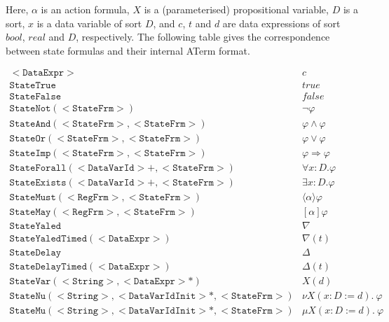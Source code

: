 Here, $\alpha$ is an action formula, $X$ is a (parameterised) propositional variable, $D$ is a
sort, $x$ is a data variable of sort $D$, and $c$, $t$ and $d$ are data expressions of sort
$bool$, $real$ and $D$, respectively. The following table gives the correspondence between
state formulas and their internal ATerm format.

\[
\begin{array}{ll}
\mathtt{<DataExpr>                                        } & c                              \\
\mathtt{StateTrue                                         } & true                           \\
\mathtt{StateFalse                                        } & false                          \\
\mathtt{StateNot(<StateFrm>)                              } & \neg \varphi                   \\
\mathtt{StateAnd(<StateFrm>, <StateFrm>)                  } & \varphi \wedge \varphi         \\
\mathtt{StateOr(<StateFrm>, <StateFrm>)                   } & \varphi \vee \varphi           \\
\mathtt{StateImp(<StateFrm>, <StateFrm>)                  } & \varphi \Rightarrow \varphi    \\
\mathtt{StateForall(<DataVarId>+, <StateFrm>)             } & \forall x{:}D .\varphi         \\
\mathtt{StateExists(<DataVarId>+, <StateFrm>)             } & \exists x{:}D .\varphi         \\
\mathtt{StateMust(<RegFrm>, <StateFrm>)                   } & \langle\alpha\rangle \varphi   \\
\mathtt{StateMay(<RegFrm>, <StateFrm>)                    } & [\alpha] \varphi               \\
\mathtt{StateYaled                                        } & \nabla                         \\
\mathtt{StateYaledTimed(<DataExpr>)                       } & \nabla(t)                      \\
\mathtt{StateDelay                                        } & \Delta                         \\
\mathtt{StateDelayTimed(<DataExpr>)                       } & \Delta(t)                      \\
\mathtt{StateVar(<String>, <DataExpr>\ast)                } & X(d)                           \\
\mathtt{StateNu(<String>, <DataVarIdInit>\ast, <StateFrm>)} & \nu  X(x{:}D:=d).~\varphi      \\
\mathtt{StateMu(<String>, <DataVarIdInit>\ast, <StateFrm>)} & \mu  X(x{:}D:=d).~\varphi
\end{array}
\]

